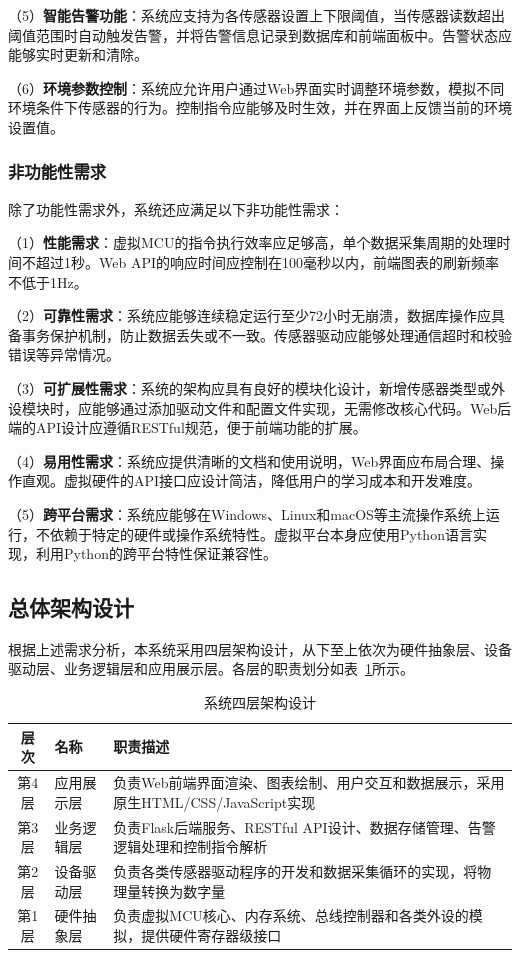 \documentclass[12pt,a4paper]{ctexart}
\begin{document}
（5）\textbf{智能告警功能}：系统应支持为各传感器设置上下限阈值，当传感器读数超出阈值范围时自动触发告警，并将告警信息记录到数据库和前端面板中。告警状态应能够实时更新和清除。

（6）\textbf{环境参数控制}：系统应允许用户通过Web界面实时调整环境参数，模拟不同环境条件下传感器的行为。控制指令应能够及时生效，并在界面上反馈当前的环境设置值。

\subsubsection{非功能性需求}

除了功能性需求外，系统还应满足以下非功能性需求：

（1）\textbf{性能需求}：虚拟MCU的指令执行效率应足够高，单个数据采集周期的处理时间不超过1秒。Web API的响应时间应控制在100毫秒以内，前端图表的刷新频率不低于1Hz。

（2）\textbf{可靠性需求}：系统应能够连续稳定运行至少72小时无崩溃，数据库操作应具备事务保护机制，防止数据丢失或不一致。传感器驱动应能够处理通信超时和校验错误等异常情况。

（3）\textbf{可扩展性需求}：系统的架构应具有良好的模块化设计，新增传感器类型或外设模块时，应能够通过添加驱动文件和配置文件实现，无需修改核心代码。Web后端的API设计应遵循RESTful规范，便于前端功能的扩展。

（4）\textbf{易用性需求}：系统应提供清晰的文档和使用说明，Web界面应布局合理、操作直观。虚拟硬件的API接口应设计简洁，降低用户的学习成本和开发难度。

（5）\textbf{跨平台需求}：系统应能够在Windows、Linux和macOS等主流操作系统上运行，不依赖于特定的硬件或操作系统特性。虚拟平台本身应使用Python语言实现，利用Python的跨平台特性保证兼容性。

\subsection{总体架构设计}

根据上述需求分析，本系统采用四层架构设计，从下至上依次为硬件抽象层、设备驱动层、业务逻辑层和应用展示层。各层的职责划分如表~\ref{tab:architecture}所示。

\begin{table}[H]
    \centering
    \caption{系统四层架构设计}
    \label{tab:architecture}
    \begin{tabular}{@{}clp{8cm}@{}}
        \toprule
        \textbf{层次} & \textbf{名称} & \textbf{职责描述} \\
        \midrule
        第4层 & 应用展示层 & 负责Web前端界面渲染、图表绘制、用户交互和数据展示，采用原生HTML/CSS/JavaScript实现 \\
        \addlinespace
        第3层 & 业务逻辑层 & 负责Flask后端服务、RESTful API设计、数据存储管理、告警逻辑处理和控制指令解析 \\
        \addlinespace
        第2层 & 设备驱动层 & 负责各类传感器驱动程序的开发和数据采集循环的实现，将物理量转换为数字量 \\
        \addlinespace
        第1层 & 硬件抽象层 & 负责虚拟MCU核心、内存系统、总线控制器和各类外设的模拟，提供硬件寄存器级接口 \\
        \bottomrule
    \end{tabular}
\end{table}
\end{document}
